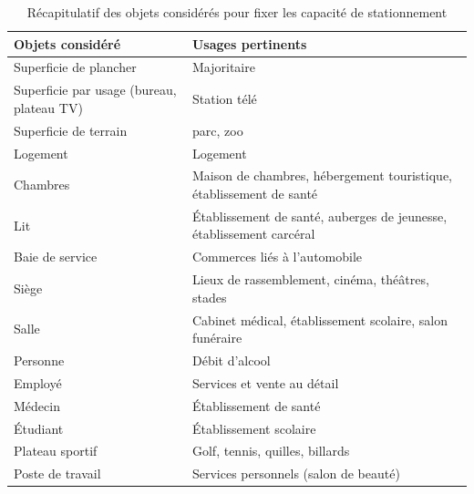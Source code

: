  \begin{table}[h]
    \centering
    \begin{tabular}{p{4cm} p{8cm}}
      \hline
      Objets considéré & Usages pertinents \\
      \hline
      Superficie de plancher & Majoritaire\\
      Superficie par usage (bureau, plateau TV) & Station télé \\
      Superficie de terrain & parc, zoo \\
      Logement & Logement \\
      Chambres & Maison de chambres, hébergement touristique, établissement de santé\\
      Lit & Établissement de santé, auberges de jeunesse, établissement carcéral \\
      Baie de service & Commerces liés à l'automobile\\
      Siège & Lieux de rassemblement, cinéma, théâtres, stades \\
      Salle & Cabinet médical, établissement scolaire, salon funéraire\\
      Personne & Débit d'alcool\\
      Employé & Services et vente au détail\\
      Médecin & Établissement de santé\\
      Étudiant & Établissement scolaire\\
      Plateau sportif & Golf, tennis, quilles, billards\\
      Poste de travail & Services personnels (salon de beauté)\\
      \hline
    \end{tabular}
    \caption{Récapitulatif des objets considérés pour fixer les capacité de stationnement}\label{tab:objet_pour_inference_capacite}
  \end{table}
  

  \FloatBarrier
